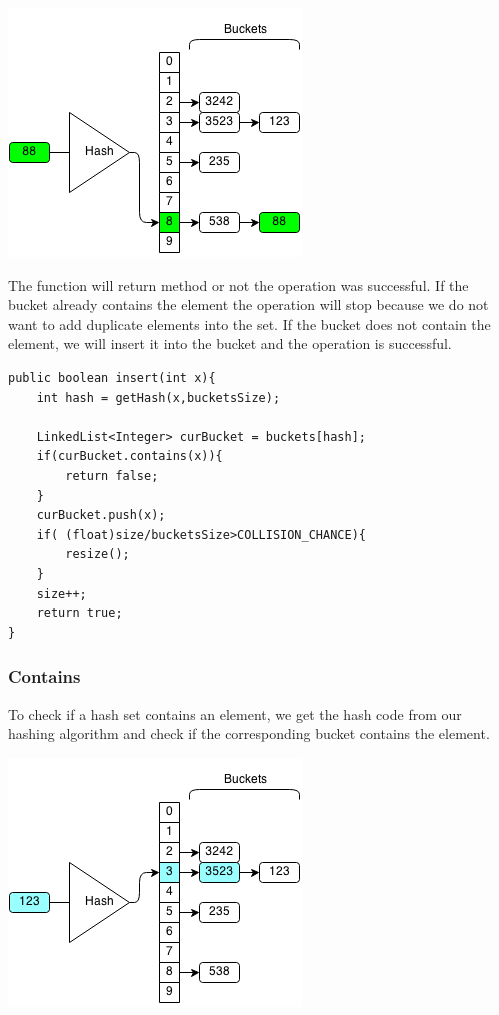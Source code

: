 \documentclass[11pt,oneside]{book}
\makeatletter
\def\maxwidth#1{\ifdim\Gin@nat@width>#1 #1\else\Gin@nat@width\fi}
\makeatother
\begin{document}
\vspace{5px}\includegraphics[width=\maxwidth{\textwidth}]{hashsetinsert.png}

The function will return method or not the operation was successful. If the bucket already contains the element the operation will stop because we do not want to add duplicate elements into the set. If the bucket does not contain the element, we will insert it into the bucket and the operation is successful.

\begin{lstlisting}
public boolean insert(int x){
    int hash = getHash(x,bucketsSize);
        
    LinkedList<Integer> curBucket = buckets[hash];
    if(curBucket.contains(x)){
        return false;
    }
    curBucket.push(x);
    if( (float)size/bucketsSize>COLLISION_CHANCE){
        resize();
    }
    size++;
    return true;
}
\end{lstlisting}

\subsubsection{Contains}

To check if a hash set contains an element, we get the hash code from our hashing algorithm and check if the corresponding bucket contains the element.

\vspace{5px}\includegraphics[width=\maxwidth{\textwidth}]{hashsetcontains.png}
\end{document}
